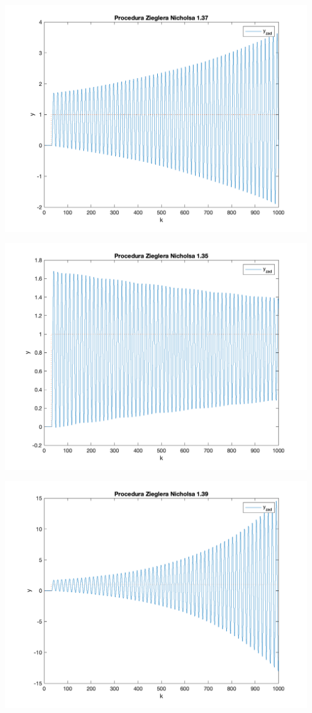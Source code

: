 \documentclass[a4paper, 11pt]{article}
\begin{document}
\begin{enumerate}
 \includegraphics[width=\linewidth]{./ModelsP3/ZN/P2_K137png.png} 
 
 \includegraphics[width=\linewidth]{./ModelsP3/ZN/P2_K135png.png} 
 
 \includegraphics[width=\linewidth]{./ModelsP3/ZN/P2_K139png.png} 
 

\end{enumerate}
\end{document}
